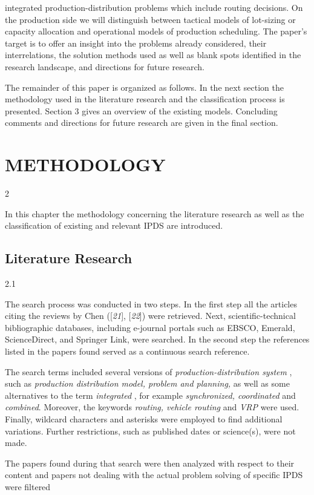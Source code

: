  integrated production-distribution problems which include routing decisions. On the
 production side we will distinguish between tactical models of lot-sizing or capacity
 allocation and operational models of production scheduling. The paper's target is to
 offer an insight into the problems already considered, their interrelations, the
 solution methods used as well as blank spots identified in the research landscape, and
 directions for future research.\par The remainder of this paper is organized as follows. In the next section the methodology
 used in the literature research and the classification process is presented. Section 3
 gives an overview of the existing models. Concluding comments and directions for future
 research are given in the final section.\section*{METHODOLOGY}2\par In this chapter the methodology concerning the literature research as well as the
 classification of existing and relevant IPDS are introduced.\subsection*{Literature Research}2.1\par The search process was conducted in two steps. In the first step all the articles
 citing the reviews by Chen ([\textit{21}], [\textit{22}]) were retrieved. Next, scientific-technical
 bibliographic databases, including e-journal portals such as EBSCO, Emerald,
 ScienceDirect, and Springer Link, were searched. In the second step the references
 listed in the papers found served as a continuous search reference.\par The search terms included several versions of \textit{production-distribution
 system} , such as \textit{production distribution model, problem and
 planning,} as well as some alternatives to the term
 \textit{integrated} , for example \textit{synchronized,
 coordinated} and \textit{combined}. Moreover, the keywords
 \textit{routing, vehicle routing} and \textit{VRP} were used.
 Finally, wildcard characters and asterisks were employed to find additional
 variations. Further restrictions, such as published dates or science(s), were not
 made.\par The papers found during that search were then analyzed with respect to their content
 and papers not dealing with the actual problem solving of specific IPDS were filtered
